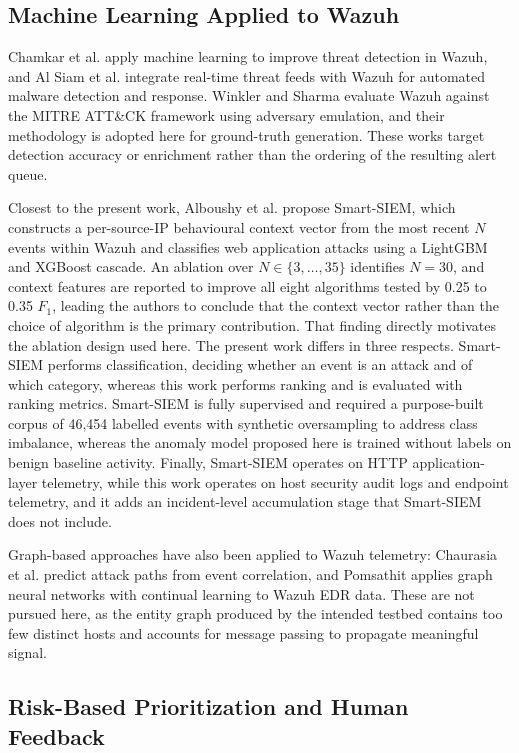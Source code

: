 \documentclass[conference]{IEEEtran}
\begin{document}
\subsection{Machine Learning Applied to Wazuh}

Chamkar et al. \cite{ref13} apply machine learning to improve threat detection in Wazuh, and Al Siam et al. \cite{ref3} integrate real-time threat feeds with Wazuh for automated malware detection and response. Winkler and Sharma \cite{ref12} evaluate Wazuh against the MITRE ATT\&CK framework using adversary emulation, and their methodology is adopted here for ground-truth generation. These works target detection accuracy or enrichment rather than the ordering of the resulting alert queue.

Closest to the present work, Alboushy et al. \cite{ref17} propose Smart-SIEM, which constructs a per-source-IP behavioural context vector from the most recent $N$ events within Wazuh and classifies web application attacks using a LightGBM and XGBoost cascade. An ablation over $N \in \{3,\dots,35\}$ identifies $N = 30$, and context features are reported to improve all eight algorithms tested by 0.25 to 0.35 $F_1$, leading the authors to conclude that the context vector rather than the choice of algorithm is the primary contribution. That finding directly motivates the ablation design used here. The present work differs in three respects. Smart-SIEM performs classification, deciding whether an event is an attack and of which category, whereas this work performs ranking and is evaluated with ranking metrics. Smart-SIEM is fully supervised and required a purpose-built corpus of 46{,}454 labelled events with synthetic oversampling to address class imbalance, whereas the anomaly model proposed here is trained without labels on benign baseline activity. Finally, Smart-SIEM operates on HTTP application-layer telemetry, while this work operates on host security audit logs and endpoint telemetry, and it adds an incident-level accumulation stage that Smart-SIEM does not include.

Graph-based approaches have also been applied to Wazuh telemetry: Chaurasia et al. \cite{ref4} predict attack paths from event correlation, and Pomsathit \cite{ref11} applies graph neural networks with continual learning to Wazuh EDR data. These are not pursued here, as the entity graph produced by the intended testbed contains too few distinct hosts and accounts for message passing to propagate meaningful signal.

\subsection{Risk-Based Prioritization and Human Feedback}
\end{document}
